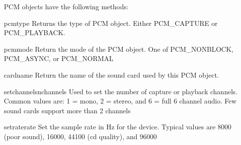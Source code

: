 PCM objects have the following methods:

\begin{methoddesc}[PCM]{pcmtype}{}
  Returns the type of PCM object. Either PCM_CAPTURE or PCM_PLAYBACK.
\end{methoddesc}

\begin{methoddesc}[PCM]{pcmmode}{}
  Return the mode of the PCM object. One of PCM_NONBLOCK, PCM_ASYNC,
  or PCM_NORMAL
\end{methoddesc}

\begin{methoddesc}[PCM]{cardname}{}
  Return the name of the sound card used by this PCM object.
\end{methoddesc}

\begin{methoddesc}[PCM]{setchannels}{nchannels}
  Used to set the number of capture or playback channels. Common
  values are: 1 = mono, 2 = stereo, and 6 = full 6 channel audio. Few
  sound cards support more than 2 channels
\end{methoddesc}

\begin{methoddesc}[PCM]{setrate}{rate}
  Set the sample rate in Hz for the device. Typical values are 8000
  (poor sound), 16000, 44100 (cd quality), and 96000
\end{methoddesc}

